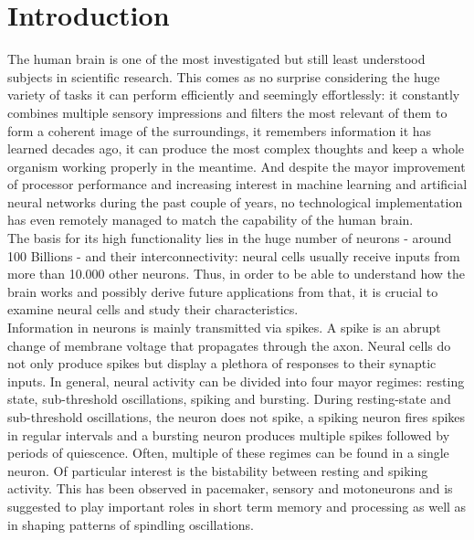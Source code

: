 \documentclass[12pt,a4paper]{article}
\begin{document}

 

\maketitle

\thispagestyle{empty}
\newpage

\tableofcontents
\thispagestyle{empty}
\newpage
{}

\section{Introduction}

The human brain is one of the most investigated but still least understood subjects in scientific research. This comes as no surprise considering the huge variety of tasks it can perform efficiently and seemingly effortlessly: it constantly combines multiple sensory impressions and filters the most relevant of them to form a coherent image of the surroundings, it remembers information it has learned decades ago, it can produce the most complex thoughts and keep a whole organism working properly in the meantime. And despite the mayor improvement of processor performance and increasing interest in machine learning and artificial neural networks during the past couple of years, no technological implementation has even remotely managed to match the capability of the human brain.\\
The basis for its high functionality lies in the huge number of neurons - around 100 Billions\cite{eqnum} - and their interconnectivity: neural cells usually receive inputs from more than 10.000 other neurons\cite{izi}. Thus, in order to be able to understand how the brain works and possibly derive future applications from that, it is crucial to examine neural cells and study their characteristics. \\
Information in neurons is mainly transmitted via spikes. A spike is an abrupt change of membrane voltage that propagates through the axon. Neural cells do not only produce spikes but display a plethora of responses to their synaptic inputs. In general, neural activity can be divided into four mayor regimes: resting state, sub-threshold oscillations, spiking and bursting\cite{dnb}. During resting-state and sub-threshold oscillations, the neuron does not spike, a spiking neuron fires spikes in regular intervals and a bursting neuron produces multiple spikes followed by periods of quiescence. Often, multiple of these regimes can be found in a single neuron. Of particular interest is the bistability between resting and spiking activity. This has been observed in pacemaker\cite{pacemaker}, sensory \cite{sensory}\cite{sensorystm1} and motoneurons\cite{moto1}\cite{moto2} and is suggested to play important roles in short term memory and processing\cite{sensorystm1}\cite{stm1}\cite{stm2} as well as in shaping patterns of spindling oscillations\cite{spindle}.
\end{document}
